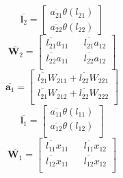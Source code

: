 \documentclass{article}
\begin{document}
\begin{equation}\overline{\bm{l}_2} = \begin{bmatrix}
   \overline{a_{21}} \theta(l_{21}) \\ \overline{a_{22}} \theta(l_{22})
\end{bmatrix}\end{equation}
\begin{equation}
    \overline{\bm{W}_{2}} = \begin{bmatrix}
        \overline{l_{21}}a_{11} && \overline{l_{21}}a_{12}\\
        \overline{l_{22}}a_{11} && \overline{l_{22}}a_{12}\\
    \end{bmatrix}
\end{equation}
\begin{equation}
    \overline{\bm{a}_{1}} = \begin{bmatrix}
       \overline{l_{21}} W_{211} + \overline{l_{22}}W_{221} \\ 
       \overline{l_{21}} W_{212} + \overline{l_{22}}W_{222} \\ 
    \end{bmatrix} 
\end{equation}
\begin{equation}
    \overline{\bm{l}_{1}} = \begin{bmatrix}
        \overline{a_{11}} \theta(l_{11}) \\
        \overline{a_{12}} \theta(l_{12}) \\
    \end{bmatrix}
\end{equation}
\begin{equation}
    \overline{\bm{W}_1} = \begin{bmatrix}
        \overline{l_{11}}x_{11} && \overline{l_{11}} x_{12} \\
        \overline{l_{12}}x_{11} && \overline{l_{12}} x_{12} \\
    \end{bmatrix}
\end{equation}
\end{document}
